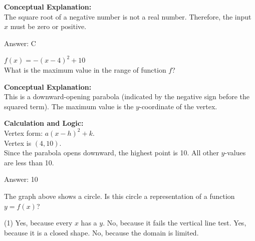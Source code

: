 \documentclass[11pt,paper=a4,answers]{exam}
\begin{document}
\begin{questions}
\begin{solution}
\textbf{Conceptual Explanation:} \\
The square root of a negative number is not a real number. Therefore, the input $x$ must be zero or positive.

\vspace{30pt}

Answer: \colorbox{yellow!100}{C}
\end{solution}

\vspace{40pt}

\question
$f(x) = -(x-4)^2 + 10$ \\
What is the maximum value in the range of function $f$?

\begin{solution}
\textbf{Conceptual Explanation:} \\
This is a downward-opening parabola (indicated by the negative sign before the squared term). The maximum value is the $y$-coordinate of the vertex.

\vspace{30pt}

\textbf{Calculation and Logic:} \\
Vertex form: $a(x-h)^2 + k$. \\
Vertex is $(4, 10)$. \\
Since the parabola opens downward, the highest point is 10. All other $y$-values are less than 10.

\vspace{30pt}

Answer: \colorbox{yellow!100}{10}
\end{solution}

\question
\begin{center}
\end{center}
The graph above shows a circle. Is this circle a representation of a function $y = f(x)$?
\begin{tasks}(1)
    \task Yes, because every $x$ has a $y$.
    \task No, because it fails the vertical line test.
    \task Yes, because it is a closed shape.
    \task No, because the domain is limited.
\end{tasks}


\end{questions}
\end{document}
